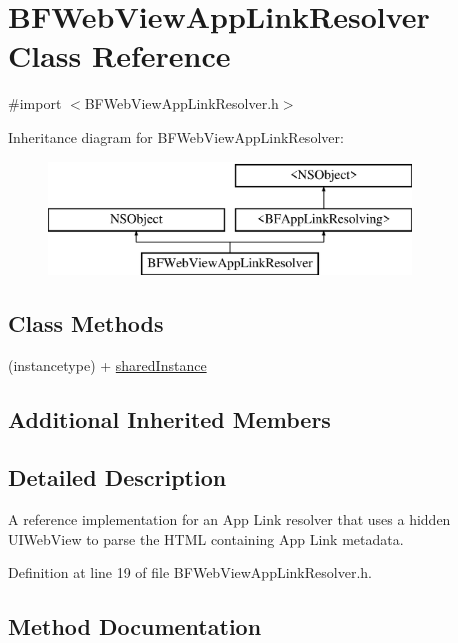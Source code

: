 \hypertarget{interface_b_f_web_view_app_link_resolver}{}\section{B\+F\+Web\+View\+App\+Link\+Resolver Class Reference}
\label{interface_b_f_web_view_app_link_resolver}


{\ttfamily \#import $<$B\+F\+Web\+View\+App\+Link\+Resolver.\+h$>$}

Inheritance diagram for B\+F\+Web\+View\+App\+Link\+Resolver\+:\begin{figure}[H]
\begin{center}
\leavevmode
\includegraphics[height=3.000000cm]{interface_b_f_web_view_app_link_resolver}
\end{center}
\end{figure}
\subsection*{Class Methods}
\begin{DoxyCompactItemize}
\item 
(instancetype) + \hyperlink{interface_b_f_web_view_app_link_resolver_abc297691dfa1ec5dff07ccf50ebee915}{shared\+Instance}
\end{DoxyCompactItemize}
\subsection*{Additional Inherited Members}


\subsection{Detailed Description}
A reference implementation for an App Link resolver that uses a hidden U\+I\+Web\+View to parse the H\+T\+M\+L containing App Link metadata. 

Definition at line 19 of file B\+F\+Web\+View\+App\+Link\+Resolver.\+h.



\subsection{Method Documentation}
\hypertarget{interface_b_f_web_view_app_link_resolver_abc297691dfa1ec5dff07ccf50ebee915}{}
